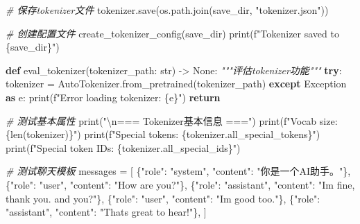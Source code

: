 \documentclass[
]{article}
\newenvironment{Shaded}{}{}
\newcommand{\BuiltInTok}[1]{\textcolor[rgb]{0.00,0.50,0.00}{#1}}
\newcommand{\CharTok}[1]{\textcolor[rgb]{0.25,0.44,0.63}{#1}}
\newcommand{\CommentTok}[1]{\textcolor[rgb]{0.38,0.63,0.69}{\textit{#1}}}
\newcommand{\ControlFlowTok}[1]{\textcolor[rgb]{0.00,0.44,0.13}{\textbf{#1}}}
\newcommand{\ImportTok}[1]{\textcolor[rgb]{0.00,0.50,0.00}{\textbf{#1}}}
\newcommand{\KeywordTok}[1]{\textcolor[rgb]{0.00,0.44,0.13}{\textbf{#1}}}
\newcommand{\NormalTok}[1]{#1}
\newcommand{\OperatorTok}[1]{\textcolor[rgb]{0.40,0.40,0.40}{#1}}
\newcommand{\PreprocessorTok}[1]{\textcolor[rgb]{0.74,0.48,0.00}{#1}}
\newcommand{\SpecialCharTok}[1]{\textcolor[rgb]{0.25,0.44,0.63}{#1}}
\newcommand{\SpecialStringTok}[1]{\textcolor[rgb]{0.73,0.40,0.53}{#1}}
\newcommand{\StringTok}[1]{\textcolor[rgb]{0.25,0.44,0.63}{#1}}
\newcommand{\VariableTok}[1]{\textcolor[rgb]{0.10,0.09,0.49}{#1}}
\begin{document}
\begin{Shaded}
\begin{Highlighting}[]
    \CommentTok{\# 保存tokenizer文件}
\NormalTok{    tokenizer.save(os.path.join(save\_dir, }\StringTok{"tokenizer.json"}\NormalTok{))}
    
    \CommentTok{\# 创建配置文件}
\NormalTok{    create\_tokenizer\_config(save\_dir)}
    \BuiltInTok{print}\NormalTok{(}\SpecialStringTok{f"Tokenizer saved to }\SpecialCharTok{\{}\NormalTok{save\_dir}\SpecialCharTok{\}}\SpecialStringTok{"}\NormalTok{)}

\KeywordTok{def}\NormalTok{ eval\_tokenizer(tokenizer\_path: }\BuiltInTok{str}\NormalTok{) }\OperatorTok{{-}\textgreater{}} \VariableTok{None}\NormalTok{:}
    \CommentTok{"""评估tokenizer功能"""}
    \ControlFlowTok{try}\NormalTok{:}
\NormalTok{        tokenizer }\OperatorTok{=}\NormalTok{ AutoTokenizer.from\_pretrained(tokenizer\_path)}
    \ControlFlowTok{except} \PreprocessorTok{Exception} \ImportTok{as}\NormalTok{ e:}
        \BuiltInTok{print}\NormalTok{(}\SpecialStringTok{f"Error loading tokenizer: }\SpecialCharTok{\{}\NormalTok{e}\SpecialCharTok{\}}\SpecialStringTok{"}\NormalTok{)}
        \ControlFlowTok{return}

    \CommentTok{\# 测试基本属性}
    \BuiltInTok{print}\NormalTok{(}\StringTok{"}\CharTok{\textbackslash{}n}\StringTok{=== Tokenizer基本信息 ==="}\NormalTok{)}
    \BuiltInTok{print}\NormalTok{(}\SpecialStringTok{f"Vocab size: }\SpecialCharTok{\{}\BuiltInTok{len}\NormalTok{(tokenizer)}\SpecialCharTok{\}}\SpecialStringTok{"}\NormalTok{)}
    \BuiltInTok{print}\NormalTok{(}\SpecialStringTok{f"Special tokens: }\SpecialCharTok{\{}\NormalTok{tokenizer}\SpecialCharTok{.}\NormalTok{all\_special\_tokens}\SpecialCharTok{\}}\SpecialStringTok{"}\NormalTok{)}
    \BuiltInTok{print}\NormalTok{(}\SpecialStringTok{f"Special token IDs: }\SpecialCharTok{\{}\NormalTok{tokenizer}\SpecialCharTok{.}\NormalTok{all\_special\_ids}\SpecialCharTok{\}}\SpecialStringTok{"}\NormalTok{)}

    \CommentTok{\# 测试聊天模板}
\NormalTok{    messages }\OperatorTok{=}\NormalTok{ [}
\NormalTok{        \{}\StringTok{"role"}\NormalTok{: }\StringTok{"system"}\NormalTok{, }\StringTok{"content"}\NormalTok{: }\StringTok{"你是一个AI助手。"}\NormalTok{\},}
\NormalTok{        \{}\StringTok{"role"}\NormalTok{: }\StringTok{"user"}\NormalTok{, }\StringTok{"content"}\NormalTok{: }\StringTok{"How are you?"}\NormalTok{\},}
\NormalTok{        \{}\StringTok{"role"}\NormalTok{: }\StringTok{"assistant"}\NormalTok{, }\StringTok{"content"}\NormalTok{: }\StringTok{"I\textquotesingle{}m fine, thank you. and you?"}\NormalTok{\},}
\NormalTok{        \{}\StringTok{"role"}\NormalTok{: }\StringTok{"user"}\NormalTok{, }\StringTok{"content"}\NormalTok{: }\StringTok{"I\textquotesingle{}m good too."}\NormalTok{\},}
\NormalTok{        \{}\StringTok{"role"}\NormalTok{: }\StringTok{"assistant"}\NormalTok{, }\StringTok{"content"}\NormalTok{: }\StringTok{"That\textquotesingle{}s great to hear!"}\NormalTok{\},}
\NormalTok{    ]}
    

\end{Highlighting}
\end{Shaded}
\end{document}

